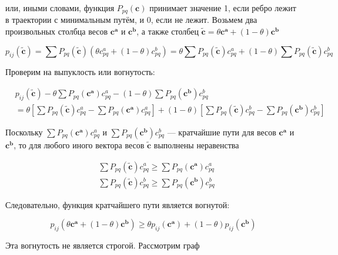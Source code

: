 	или, иными словами, функция $P_{pq}(\mathbf{c})$ принимает значение 1, если
	ребро лежит в траектории с минимальным путём, и 0, если не лежит. Возьмем два
	произвольных столбца весов $\mathbf{c^a}$ и $\mathbf{c^b}$, а также столбец
	$\mathbf{\tilde{c}} = \theta \mathbf{c^a} + (1-\theta)\mathbf{c^b}$
	
	\begin{equation}
	p_{ij}(\mathbf{\tilde{c}}) = \sum P_{pq}(\mathbf{\tilde{c}}) (\theta c_{pq}^a +
	(1 - \theta) c_{pq}^b) = \theta \sum P_{pq}(\mathbf{\tilde{c}}) c_{pq}^a + (1 -
	\theta) \sum P_{pq}(\mathbf{\tilde{c}})  c_{pq}^b 
	\end{equation}
	
	Проверим на выпуклость или вогнутость:
	
	\begin{equation}
	\begin{split}
	&p_{ij}(\mathbf{\tilde{c}}) - \theta \sum P_{pq}(\mathbf{c^a}) c_{pq}^a - (1 -
	\theta) \sum P_{pq}(\mathbf{c^b})  c_{pq}^b \\
	&= \theta \left[ \sum P_{pq}(\mathbf{\tilde{c}}) c_{pq}^a - \sum
	P_{pq}(\mathbf{c^a}) c_{pq}^a \right]  + (1 - \theta) \left[ \sum
	P_{pq}(\mathbf{\tilde{c}}) c_{pq}^b - \sum P_{pq}(\mathbf{c^b}) c_{pq}^b\right] 
	\end{split}
	\end{equation}
	
	Поскольку $\sum P_{pq}(\mathbf{c^a}) c_{pq}^a$ и $\sum P_{pq}(\mathbf{c^b})
	c_{pq}^b$ --- кратчайшие пути для весов $\mathbf{c^a}$ и $\mathbf{c^b}$, то для
	любого иного вектора весов $\mathbf{\tilde{c}}$ выполнены неравенства
	
	\begin{equation}
	\begin{split}
	&\sum P_{pq}(\mathbf{\tilde{c}}) c_{pq}^a \geqslant \sum P_{pq}(\mathbf{c^a})
	c_{pq}^a \\
	&\sum P_{pq}(\mathbf{\tilde{c}}) c_{pq}^b \geqslant \sum P_{pq}(\mathbf{c^b})
	c_{pq}^b
	\end{split}
	\end{equation}	
	
	Следовательно, функция кратчайшего пути является вогнутой:
	
	\begin{equation}
	p_{ij}(\theta \mathbf{c^a} + (1 - \theta) \mathbf{c^b}) \geqslant \theta
	p_{ij}( \mathbf{c^a}) + (1-\theta ) p_{ij}( \mathbf{c^b}) 
	\end{equation}
	
	Эта вогнутость не является строгой. Рассмотрим граф
	
